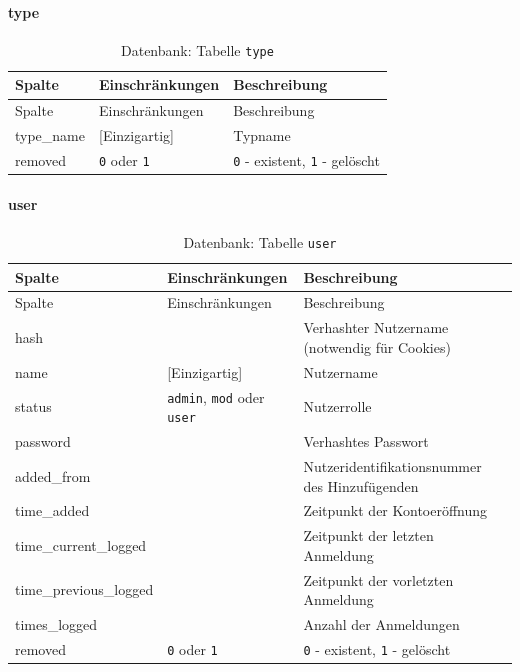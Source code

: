 \documentclass[
]{article}
\begin{document}
\hypertarget{type-1}{%
\paragraph{type}\label{type-1}}

\begin{longtable}[]{@{}lll@{}}
\caption{\label{tab:type} Datenbank: Tabelle \texttt{type}}\tabularnewline
\toprule
Spalte & Einschränkungen & Beschreibung \\
\midrule
\endfirsthead
\toprule
Spalte & Einschränkungen & Beschreibung \\
\midrule
\endhead
type\_name & {[}Einzigartig{]} & Typname \\
removed & \texttt{0} oder \texttt{1} & \texttt{0} - existent, \texttt{1} - gelöscht \\
\bottomrule
\end{longtable}

\hypertarget{user}{%
\paragraph{user}\label{user}}

\begin{longtable}[]{@{}lll@{}}
\caption{\label{tab:user} Datenbank: Tabelle \texttt{user}}\tabularnewline
\toprule
Spalte & Einschränkungen & Beschreibung \\
\midrule
\endfirsthead
\toprule
Spalte & Einschränkungen & Beschreibung \\
\midrule
\endhead
hash & & Verhashter Nutzername (notwendig für Cookies) \\
name & {[}Einzigartig{]} & Nutzername \\
status & \texttt{admin}, \texttt{mod} oder \texttt{user} & Nutzerrolle \\
password & & Verhashtes Passwort \\
added\_from & & Nutzeridentifikationsnummer des Hinzufügenden \\
time\_added & & Zeitpunkt der Kontoeröffnung \\
time\_current\_logged & & Zeitpunkt der letzten Anmeldung \\
time\_previous\_logged & & Zeitpunkt der vorletzten Anmeldung \\
times\_logged & & Anzahl der Anmeldungen \\
removed & \texttt{0} oder \texttt{1} & \texttt{0} - existent, \texttt{1} - gelöscht \\
\bottomrule
\end{longtable}
\end{document}
